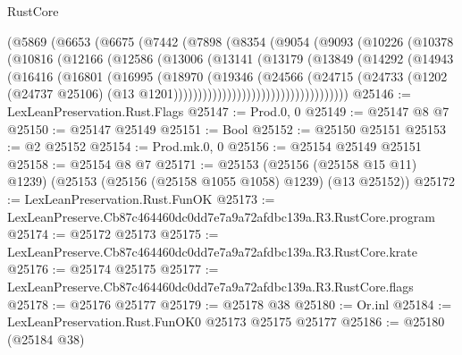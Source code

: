 \begin{lexlean}{RustCore}
\begin{coremodule}
                  (@5869
                    (@6653
                      (@6675
                        (@7442
                          (@7898
                            (@8354
                              (@9054
                                (@9093
                                  (@10226
                                    (@10378
                                      (@10816
                                        (@12166
                                          (@12586
                                            (@13006
                                              (@13141
                                                (@13179
                                                  (@13849
                                                    (@14292
                                                      (@14943
                                                        (@16416
                                                          (@16801
                                                            (@16995
                                                              (@18970
                                                                (@19346
                                                                  (@24566
                                                                    (@24715
                                                                      (@24733
                                                                        (@1202
                                                                          (@24737 @25106)
                                                                          (@13
                                                                            @1201))))))))))))))))))))))))))))))))))))
@25146 := LexLeanPreservation.Rust.Flags
@25147 := Prod.{0, 0}
@25149 := @25147 @8 @7
@25150 := @25147 @25149
@25151 := Bool
@25152 := @25150 @25151
@25153 := @2 @25152
@25154 := Prod.mk.{0, 0}
@25156 := @25154 @25149 @25151
@25158 := @25154 @8 @7
@25171 := @25153
    (@25156 (@25158 @15 @11) @1239)
    (@25153 (@25156 (@25158 @1055 @1058) @1239) (@13 @25152))
@25172 := LexLeanPreservation.Rust.FunOK
@25173 := LexLeanPreserve.Cb87c464460dc0dd7e7a9a72afdbc139a.R3.RustCore.program
@25174 := @25172 @25173
@25175 := LexLeanPreserve.Cb87c464460dc0dd7e7a9a72afdbc139a.R3.RustCore.krate
@25176 := @25174 @25175
@25177 := LexLeanPreserve.Cb87c464460dc0dd7e7a9a72afdbc139a.R3.RustCore.flags
@25178 := @25176 @25177
@25179 := @25178 @38
@25180 := Or.inl
@25184 := LexLeanPreservation.Rust.FunOK0 @25173 @25175 @25177
@25186 := @25180 (@25184 @38)

\end{coremodule}
\end{lexlean}
